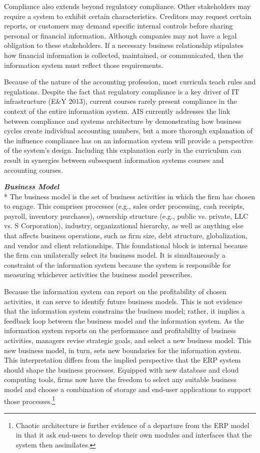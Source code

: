 \documentclass[12pt]{article}
\newcommand{\SubSubSection}[1]{{\centering{}\normalsize{}\textbf{\emph{#1}}}\\*\indent{}}
\begin{document}
Compliance also extends beyond regulatory compliance. Other stakeholders may require a system to exhibit certain characteristics. Creditors may request certain reports, or customers may demand specific internal controls before sharing personal or financial information. Although companies may not have a legal obligation to these stakeholders. If a necessary business relationship stipulates how financial information is collected, maintained, or communicated, then the information system must reflect those requirements.

Because of the nature of the accounting profession, most curricula teach rules and regulations. Despite the fact that regulatory compliance is a key driver of IT infrastructure (E\&Y 2013), current courses rarely present compliance in the context of the entire information system. AIS currently addresses the link between compliance and systems architecture by demonstrating how business cycles create individual accounting numbers, but a more thorough explanation of the influence compliance has on an information system will provide a perspective of the system's design. Including this explanation early in the curriculum can result in synergies between subsequent information systems courses and accounting courses.

\SubSubSection{Business Model}
The business model is the set of business activities in which the firm has chosen to engage. This comprises processes (e.g., sales order processing, cash receipts, payroll, inventory purchases), ownership structure (e.g., public vs. private, LLC vs. S Corporation), industry, organizational hierarchy, as well as anything else that affects business operations, such as firm size, debt structure, globalization, and vendor and client relationships. This foundational block is internal because the firm can unilaterally select its business model. It is simultaneously a constraint of the information system because the system is responsible for measuring whichever activities the business model prescribes.

Because the information system can report on the profitability of chosen activities, it can serve to identify future business models. This is not evidence that the information system constrains the business model; rather, it implies a feedback loop between the business model and the information system. As the information system reports on the performance and profitability of business activities, managers revise strategic goals, and select a new business model. This new business model, in turn, sets new boundaries for the information system. This interpretation differs from the implied perspective that the ERP system should shape the business processes. Equipped with new database and cloud computing tools, firms now have the freedom to select any suitable business model and choose a combination of storage and end-user applications to support those processes.\footnote{Chaotic architecture is further evidence of a departure from the ERP model in that it ask end-users to develop their own modules and interfaces that the system then assimilates.}
\end{document}
